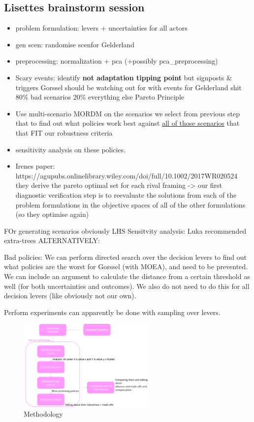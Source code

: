 


\subsection{Lisettes brainstorm session}
\begin{itemize}
    \item problem formulation: levers + uncertainties for all actors
    \item gen scen: randomise scenfor Gelderland
    \item preprocessing: normalization + pca (+possibly pca\_preprocessing)
    \item Scary events: identify \textbf{not adaptation tipping point} but signposts \& triggers Gorssel should be watching out for with events for Gelderland shit 80\% bad scenarios 20\% everything else Pareto Principle 
    \item Use multi-scenario MORDM on the scenarios we select from previous step that to find out what policies work best against \underline{all of those scenarios} that that FIT our robustness criteria
    \item sensitivity analysis on these policies.
    \item Irenes paper: https://agupubs.onlinelibrary.wiley.com/doi/full/10.1002/2017WR020524  they derive the pareto optimal set for each rival framing -> our first diagnostic verification step is to reevaluate the solutions from each of the problem formulations in the objective spaces of all of the other formulations (so they optimise again)
\end{itemize}

FOr generating scenarios obviously LHS
Sensitvity analysis: Luka recommended extra-trees
ALTERNATIVELY:

Bad policies: We can perform directed search over the decision levers to find out what policies are the worst for Gorssel (with MOEA), and need to be prevented. We can include an argument to calculate the distance from a certain threshold as well (for both uncertainties and outcomes). We also do not need to do this for all decision levers (like obviously not our own).

Perform experiments can apparently be done with sampling over levers.

\begin{figure}[h!]
    \centering
    \includegraphics[width=0.6\textwidth]{report/figures/methodology.png} 
    \caption{Methodology}
    \label{fig:methodology}
\end{figure}

